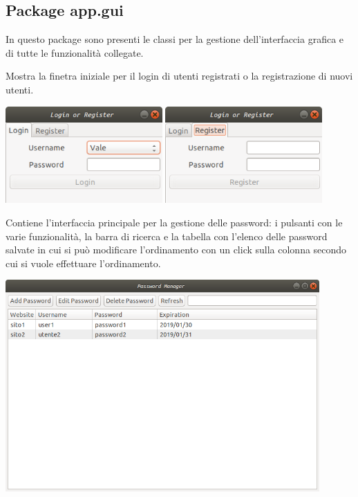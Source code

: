 \subsection{Package app.gui}
In questo package sono presenti le classi per la gestione dell'interfaccia grafica e di tutte le funzionalità collegate.
\begin{myitemize}{}
	\item[\class{LoginGUI}] Mostra la finetra iniziale per il login di utenti registrati o la registrazione di nuovi utenti.
		\begin{center} \includegraphics[width=6cm]{Immagini/Login.png} \includegraphics[width=6cm]{Immagini/Register.png}  \end{center}
		
	\item[\class{PasswordManagerGUI}] Contiene l'interfaccia principale per la gestione delle password: i pulsanti con le varie funzionalità, la barra di ricerca e la tabella con l'elenco delle password salvate in cui si può modificare l'ordinamento con un click sulla colonna secondo cui si vuole effettuare l'ordinamento.
		\begin{center} \includegraphics[width=12cm]{Immagini/PasswordGUI.png} \end{center}		


\end{myitemize}

